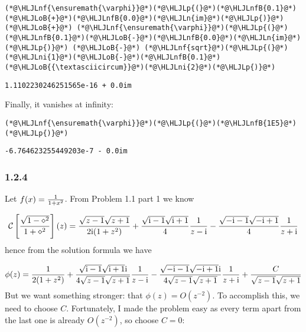 \documentclass[12pt,landscape]{article}
\newcommand{\HLJLn}[1]{#1}
\newcommand{\HLJLnf}[1]{\textcolor[RGB]{66,102,213}{#1}}
\newcommand{\HLJLnfB}[1]{\textcolor[RGB]{59,151,46}{#1}}
\newcommand{\HLJLni}[1]{\textcolor[RGB]{59,151,46}{#1}}
\newcommand{\HLJLoB}[1]{\textcolor[RGB]{102,102,102}{\textbf{#1}}}
\newcommand{\HLJLp}[1]{#1}
\def\I{ {\rm i} }
\def\CC{ {\cal C} }
\begin{document}
{\begin{lstlisting}
(*@\HLJLnf{\ensuremath{\varphi}}@*)(*@\HLJLp{(}@*)(*@\HLJLnfB{0.1}@*)(*@\HLJLoB{+}@*)(*@\HLJLnfB{0.0}@*)(*@\HLJLn{im}@*)(*@\HLJLp{)}@*) (*@\HLJLoB{+}@*) (*@\HLJLnf{\ensuremath{\varphi}}@*)(*@\HLJLp{(}@*)(*@\HLJLnfB{0.1}@*)(*@\HLJLoB{-}@*)(*@\HLJLnfB{0.0}@*)(*@\HLJLn{im}@*)(*@\HLJLp{)}@*) (*@\HLJLoB{-}@*) (*@\HLJLnf{sqrt}@*)(*@\HLJLp{(}@*)(*@\HLJLni{1}@*)(*@\HLJLoB{-}@*)(*@\HLJLnfB{0.1}@*)(*@\HLJLoB{{\textasciicircum}}@*)(*@\HLJLni{2}@*)(*@\HLJLp{)}@*)
\end{lstlisting}

\begin{lstlisting}
1.1102230246251565e-16 + 0.0im
\end{lstlisting}


Finally, it vanishes at infinity:


\begin{lstlisting}
(*@\HLJLnf{\ensuremath{\varphi}}@*)(*@\HLJLp{(}@*)(*@\HLJLnfB{1E5}@*)(*@\HLJLp{)}@*)
\end{lstlisting}

\begin{lstlisting}
-6.764623255449203e-7 - 0.0im
\end{lstlisting}


\subsubsection{1.2.4}
Let $f(x) = {1 \over 1+x^2}$. From Problem 1.1 part 1 we know

\[
\CC\left[{\sqrt{1-\diamond^2}\over 1 + \diamond^2}\right] (z) = {\sqrt{z-1} \sqrt{z+1}  \over 2\I(1 + z^2)}  + {\sqrt{\I -1} \sqrt{\I+1} \over 4} { 1 \over z - \I} - {\sqrt{-\I -1} \sqrt{-\I+1} \over 4} { 1 \over z + \I}
\]
hence from the solution formula we have

\[
\phi(z) = {1  \over 2(1 + z^2)}  + {\sqrt{\I -1} \sqrt{\I+1} \I \over 4\sqrt{z-1} \sqrt{z+1}} { 1 \over z - \I} - {\sqrt{-\I -1} \sqrt{-\I+1} \I \over 4\sqrt{z-1} \sqrt{z+1}} { 1 \over z + \I} + {C \over \sqrt{z-1} \sqrt{z+1}}
\]
But we want something stronger: that $\phi(z) = O(z^{-2})$. To accomplish this, we need to choose $C$.  Fortunately, I made the problem easy as every term apart from the last one is already $O(z^{-2})$, so choose $C = 0$:


}
\end{document}
